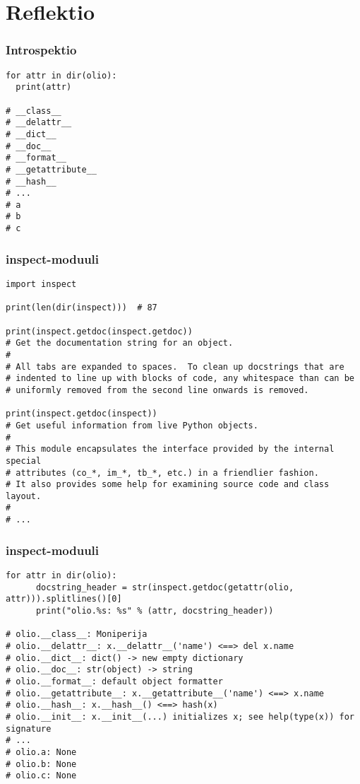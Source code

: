 \documentclass{beamer}
\begin{document}
\section{Reflektio}

\begin{frame}[fragile]
\frametitle{Introspektio}
\begin{verbatim}
for attr in dir(olio): 
  print(attr)

# __class__
# __delattr__
# __dict__
# __doc__
# __format__
# __getattribute__
# __hash__
# ...
# a
# b
# c
\end{verbatim}
\end{frame}

\begin{frame}[fragile]
\frametitle{inspect-moduuli}
\begin{verbatim}
import inspect

print(len(dir(inspect)))  # 87

print(inspect.getdoc(inspect.getdoc))
# Get the documentation string for an object.
# 
# All tabs are expanded to spaces.  To clean up docstrings that are
# indented to line up with blocks of code, any whitespace than can be
# uniformly removed from the second line onwards is removed.

print(inspect.getdoc(inspect))
# Get useful information from live Python objects.
# 
# This module encapsulates the interface provided by the internal special
# attributes (co_*, im_*, tb_*, etc.) in a friendlier fashion.
# It also provides some help for examining source code and class layout.
#
# ...

\end{verbatim}
\end{frame}

\begin{frame}[fragile]
\frametitle{inspect-moduuli}
\begin{verbatim}
for attr in dir(olio):
      docstring_header = str(inspect.getdoc(getattr(olio, attr))).splitlines()[0]
      print("olio.%s: %s" % (attr, docstring_header))

# olio.__class__: Moniperija
# olio.__delattr__: x.__delattr__('name') <==> del x.name
# olio.__dict__: dict() -> new empty dictionary
# olio.__doc__: str(object) -> string
# olio.__format__: default object formatter
# olio.__getattribute__: x.__getattribute__('name') <==> x.name
# olio.__hash__: x.__hash__() <==> hash(x)
# olio.__init__: x.__init__(...) initializes x; see help(type(x)) for signature
# ...
# olio.a: None
# olio.b: None
# olio.c: None

\end{verbatim}
\end{frame}
\end{document}
